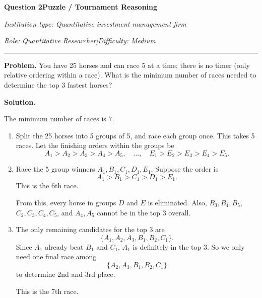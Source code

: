 \documentclass[11pt,letterpaper,openany]{book}
\newcommand{\InterviewQuestionHeader}[5]{%
  \vspace{1.0em}%
  {\large\bfseries #1\enspace #4\par}%
  {\small\itshape Institution type: #2\par}%
  {\small\itshape Role: #3\enspace |\enspace Difficulty: #5\par}%
  \vspace{0.25em}\hrule\vspace{0.45em}%
}
\begin{document}
\InterviewQuestionHeader{Question 2}{Quantitative investment management firm}{Quantitative Researcher}{Puzzle / Tournament Reasoning}{Medium}
\textbf{Problem.} You have 25 horses and can race 5 at a time; there is no timer (only relative ordering within a race). What is the minimum number of races needed to determine the top 3 fastest horses?

\textbf{Solution.}

The minimum number of races is \(\boxed{7}\).

\begin{enumerate}
\item Split the 25 horses into 5 groups of 5, and race each group once. This takes 5 races. Let the finishing orders within the groups be
\[
A_1 > A_2 > A_3 > A_4 > A_5,\quad \ldots,\quad E_1 > E_2 > E_3 > E_4 > E_5.
\]

\item Race the 5 group winners \(A_1,B_1,C_1,D_1,E_1\). Suppose the order is
\[
A_1 > B_1 > C_1 > D_1 > E_1.
\]
This is the 6th race.

From this, every horse in groups \(D\) and \(E\) is eliminated. Also, \(B_3,B_4,B_5\), \(C_2,C_3,C_4,C_5\), and \(A_4,A_5\) cannot be in the top 3 overall.

\item The only remaining candidates for the top 3 are
\[
\{A_1, A_2, A_3, B_1, B_2, C_1\}.
\]
Since \(A_1\) already beat \(B_1\) and \(C_1\), \(A_1\) is definitely in the top 3. So we only need one final race among
\[
\{A_2, A_3, B_1, B_2, C_1\}
\]
to determine 2nd and 3rd place.

This is the 7th race.
\end{enumerate}
\end{document}

